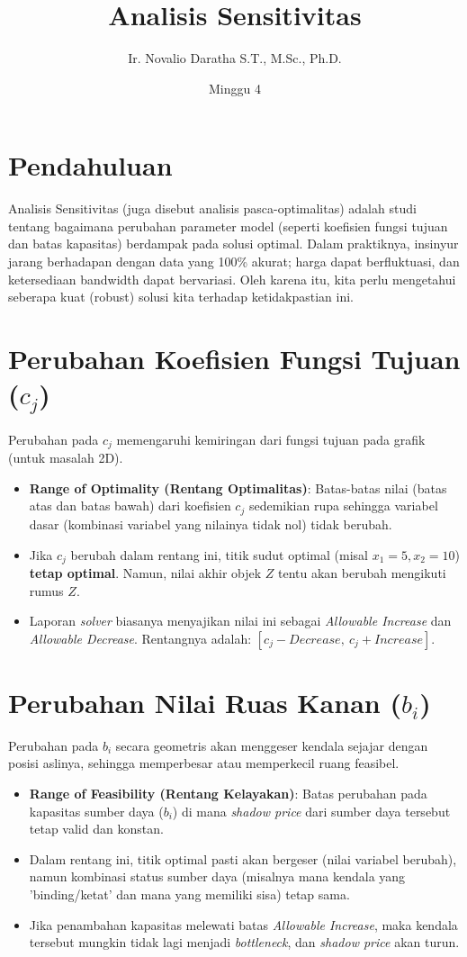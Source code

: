 \documentclass[11pt, a4paper]{article}
\title{\vspace{-1cm}\color{UNIBBlue}\textbf{Analisis Sensitivitas}\vspace{-0.5cm}}
\author{Ir. Novalio Daratha S.T., M.Sc., Ph.D.}
\date{Minggu 4}
\begin{document}
\maketitle

\section{Pendahuluan}
Analisis Sensitivitas (juga disebut analisis pasca-optimalitas) adalah studi tentang bagaimana perubahan parameter model (seperti koefisien fungsi tujuan dan batas kapasitas) berdampak pada solusi optimal. Dalam praktiknya, insinyur jarang berhadapan dengan data yang 100\% akurat; harga dapat berfluktuasi, dan ketersediaan bandwidth dapat bervariasi. Oleh karena itu, kita perlu mengetahui seberapa kuat (robust) solusi kita terhadap ketidakpastian ini.

\section{Perubahan Koefisien Fungsi Tujuan ($c_j$)}
Perubahan pada $c_j$ memengaruhi kemiringan dari fungsi tujuan pada grafik (untuk masalah 2D).
\begin{itemize}
    \item \textbf{Range of Optimality (Rentang Optimalitas)}: Batas-batas nilai (batas atas dan batas bawah) dari koefisien $c_j$ sedemikian rupa sehingga variabel dasar (kombinasi variabel yang nilainya tidak nol) tidak berubah.
    \item Jika $c_j$ berubah dalam rentang ini, titik sudut optimal (misal $x_1=5, x_2=10$) \textbf{tetap optimal}. Namun, nilai akhir objek $Z$ tentu akan berubah mengikuti rumus $Z$.
    \item Laporan \textit{solver} biasanya menyajikan nilai ini sebagai \textit{Allowable Increase} dan \textit{Allowable Decrease}. Rentangnya adalah: $[c_j - Decrease, \ c_j + Increase]$.
\end{itemize}

\section{Perubahan Nilai Ruas Kanan ($b_i$)}
Perubahan pada $b_i$ secara geometris akan menggeser kendala sejajar dengan posisi aslinya, sehingga memperbesar atau memperkecil ruang feasibel.
\begin{itemize}
    \item \textbf{Range of Feasibility (Rentang Kelayakan)}: Batas perubahan pada kapasitas sumber daya ($b_i$) di mana \textit{shadow price} dari sumber daya tersebut tetap valid dan konstan.
    \item Dalam rentang ini, titik optimal pasti akan bergeser (nilai variabel berubah), namun kombinasi status sumber daya (misalnya mana kendala yang 'binding/ketat' dan mana yang memiliki sisa) tetap sama.
    \item Jika penambahan kapasitas melewati batas \textit{Allowable Increase}, maka kendala tersebut mungkin tidak lagi menjadi \textit{bottleneck}, dan \textit{shadow price} akan turun.
\end{itemize}
\end{document}
